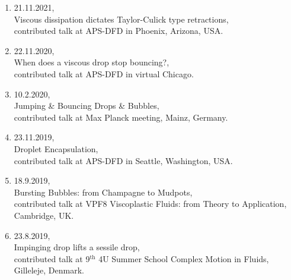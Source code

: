 \documentclass[10pt,a4paper,colorlinks,linkcolor=blue,urlcolor=blue,citecolor=blue]{moderncv}
\begin{document}
\begin{enumerate}[leftmargin=0.75cm]

	\item 21.11.2021,\\
	Viscous dissipation dictates Taylor-Culick type retractions,\\
	contributed talk at APS-DFD in Phoenix, Arizona, USA.

	\item 22.11.2020,\\
	When does a viscous drop stop bouncing?,\\
	contributed talk at APS-DFD in virtual Chicago.

	\item 10.2.2020,\\
	Jumping \& Bouncing Drops \& Bubbles,\\
	contributed talk at Max Planck meeting, Mainz, Germany.

	\item 23.11.2019,\\
	Droplet Encapsulation,\\
	contributed talk at APS-DFD in Seattle, Washington, USA.

	\item 18.9.2019,\\
	Bursting Bubbles: from Champagne to Mudpots,\\
	contributed talk at VPF8 Viscoplastic Fluids: from Theory to Application, Cambridge, UK.

	\item 23.8.2019,\\
	Impinging drop lifts a sessile drop,\\
	contributed talk at 9$^\text{th}$ 4U Summer School Complex Motion in Fluids, Gilleleje, Denmark.




\end{enumerate}
\end{document}
